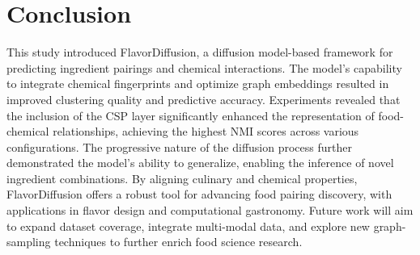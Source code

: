 \section{Conclusion}
This study introduced FlavorDiffusion, a diffusion model-based framework for predicting ingredient pairings and chemical interactions. The model’s capability to integrate chemical fingerprints and optimize graph embeddings resulted in improved clustering quality and predictive accuracy. Experiments revealed that the inclusion of the CSP layer significantly enhanced the representation of food-chemical relationships, achieving the highest NMI scores across various configurations. The progressive nature of the diffusion process further demonstrated the model’s ability to generalize, enabling the inference of novel ingredient combinations. By aligning culinary and chemical properties, FlavorDiffusion offers a robust tool for advancing food pairing discovery, with applications in flavor design and computational gastronomy. Future work will aim to expand dataset coverage, integrate multi-modal data, and explore new graph-sampling techniques to further enrich food science research.

